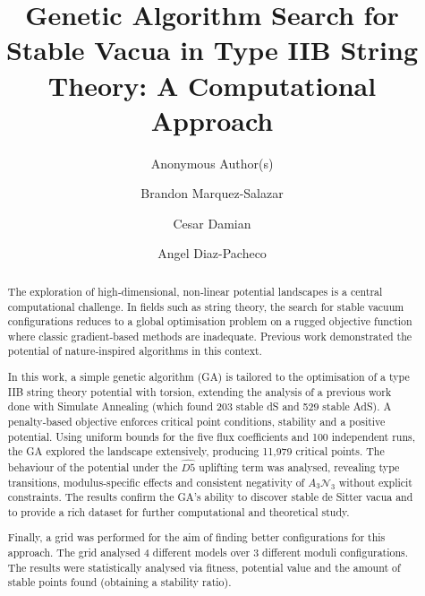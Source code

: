 \documentclass[runningheads]{llncs}
\begin{document}
%
\title{
Genetic Algorithm Search for Stable Vacua in Type IIB String Theory: A Computational Approach
}

\ifdefined\isanonymous
  \author{Anonymous Author(s)}
\else
  \author{Brandon Marquez-Salazar \and
  Cesar Damian \and
  Angel Diaz-Pacheco}
\fi

\maketitle              %
%
\begin{abstract}

The exploration of high‑dimensional, non‑linear potential
landscapes is a central computational challenge. In fields
such as string theory, the search for stable vacuum
configurations reduces to a global optimisation problem on a
rugged objective function where classic grad\-ient‑based
methods are inadequate. Previous work demonstrated the
potential of nature‑inspired algorithms in this context.

In this work, a simple genetic algorithm (GA) is tailored to
the optimisation of a type IIB string theory potential with
torsion, extending the analysis of a previous work done with
Simulate Annealing (which found 203 stable dS and 529 stable
AdS). A penalty‑based objective enforces
critical point conditions, stability and a positive potential.
Using uniform bounds for the five flux coefficients and 100
independent runs, the GA explored the landscape extensively,
producing 11,979 critical points. The behaviour of the
potential under the $\widehat{D5}$ uplifting term was
analysed, revealing type transitions, modulus‑specific
effects and consistent negativity of $A_3\mathcal{N}_3$
without explicit constraints. The results confirm the GA’s
ability to discover stable de Sitter vacua and to provide a
rich dataset for further computational and theoretical study.

Finally, a grid was performed for the aim of finding better
configurations for this approach. The grid analysed 4
different models over 3 different moduli configurations.
The results were statistically analysed via fitness,
potential value and the amount of stable points found
(obtaining a stability ratio).

\end{abstract}
\end{document}
